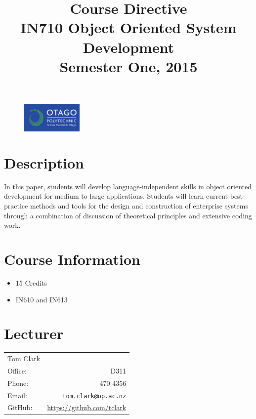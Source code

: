\documentclass{article}
\begin{document}
\begin{figure}
\includegraphics[width=30mm]{../../../resources/images/oplogo.png}
\end{figure}

\title{Course Directive\\IN710 Object Oriented System Development\\Semester One, 2015}
\date{}
\maketitle

\section*{Description}
In this paper, students will develop language-independent skills in object oriented development for medium to large applications. Students will learn current best-practice methods and tools for the design and construction of enterprise systems through a combination of discussion of theoretical principles and extensive coding work.


\section*{Course Information}
\begin{itemize}
  \item 15 Credits
  \item IN610 and IN613
\end{itemize}

\section*{Lecturer}
\begin{tabular}{lr}

  Tom Clark &    \\
     Office: & D311 \\
     Phone: & 470 4356 \\
     Email: & \texttt{tom.clark@op.ac.nz} \\
     GitHub: & \url{https://github.com/tclark} 
\end{tabular}
\end{document}
